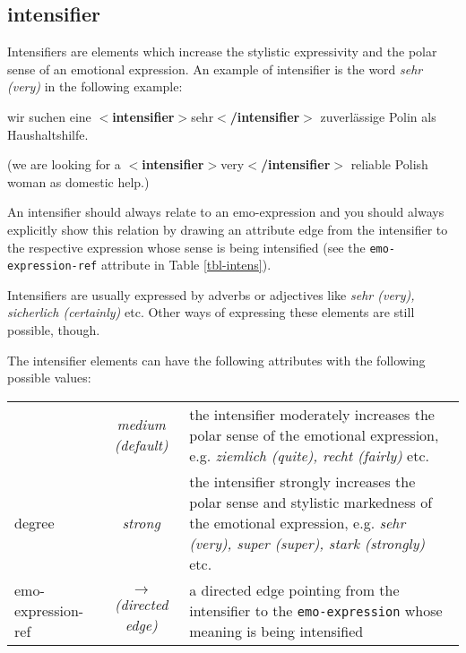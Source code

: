 \documentclass[11pt,a4paper]{article}
\newcommand{\xmltag}[1]{{\textbf{\small$<$#1$>$}}}
\newcommand{\intensifier}[1]{\xmltag{intensifier}#1\xmltag{/intensifier}}
\newlength\clmnwidth
\newenvironment{myexe}{
  \begin{exe}
    \ex\begin{center}
    \itshape
}{
    \end{center}
  \end{exe}
}
\begin{document}
\subsection{intensifier}
Intensifiers are elements which increase the stylistic expressivity
and the polar sense of an emotional expression.  An example of
intensifier is the word \textit{sehr (very)} in the following example:
\begin{myexe}
  wir suchen eine \intensifier{sehr} zuverl\"assige Polin als
  Haushaltshilfe.

  (we are looking for a \intensifier{very} reliable Polish woman as
  domestic help.)
\end{myexe}
An intensifier should always relate to an emo-expression and you
should always explicitly show this relation by drawing an attribute
edge from the intensifier to the respective expression whose sense is
being intensified (see the \texttt{emo-expression-ref} attribute in
Table \ref{tbl-intens}).

Intensifiers are usually expressed by adverbs or adjectives like
\textit{sehr (very), sicherlich (certainly)} etc.  Other ways of
expressing these elements are still possible, though.

The intensifier elements can have the following attributes with the
following possible values:
\begin{center}
  \begin{tabular}{|l|c|p{\clmnwidth}|}\hline\label{tbl-intens}

    & \textit{medium (default)} & the intensifier moderately increases
    the polar sense of the emotional expression, e.g. \textit{ziemlich
      (quite), recht (fairly)} etc.\\\cline{2-3}

    \multirow{-2}{*}{degree} & \textit{strong} & the intensifier
    strongly increases the polar sense and stylistic markedness of the
    emotional expression, e.g. \textit{sehr (very), super (super),
      stark (strongly)} etc.\\\hline


    emo-expression-ref & \textit{$\longrightarrow$\newline(directed
      edge)} & a directed edge pointing from the intensifier to the
    \texttt{emo-expression} whose meaning is being intensified\\\hline
  \end{tabular}
\end{center}
\end{document}
